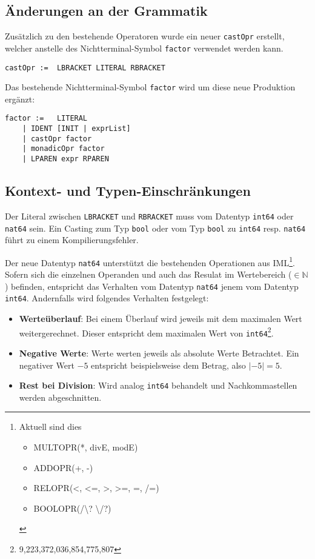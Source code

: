 \documentclass[10pt, a4paper, twocolumn]{article} %
\begin{document}
\subsection{Änderungen an der Grammatik}

Zusätzlich zu den bestehende Operatoren wurde ein neuer \texttt{castOpr} erstellt, welcher anstelle des Nichtterminal-Symbol \texttt{factor} verwendet werden kann.
\begin{lstlisting}[backgroundcolor = \color{lightgray},
xleftmargin = 0.05cm,
framexleftmargin = 0.05em]
    castOpr :=  LBRACKET LITERAL RBRACKET
\end{lstlisting}
Das bestehende Nichtterminal-Symbol \texttt{factor} wird um diese neue Produktion ergänzt:
\begin{lstlisting}[backgroundcolor = \color{lightgray},
xleftmargin = 0.05cm,
framexleftmargin = 0.05em]
    factor :=   LITERAL
    | IDENT [INIT | exprList]
    | castOpr factor
    | monadicOpr factor
    | LPAREN expr RPAREN
\end{lstlisting}

\subsection{Kontext- und Typen-Einschränkungen}
Der Literal zwischen \texttt{LBRACKET} und \texttt{RBRACKET} muss vom Datentyp \texttt{int64} oder \texttt{nat64} sein.
Ein Casting zum Typ \texttt{bool} oder vom Typ \texttt{bool} zu \texttt{int64} resp. \texttt{nat64} führt zu einem Kompilierungsfehler.

Der neue Datentyp \texttt{nat64} unterstützt die bestehenden Operationen aus IML\footnote{Aktuell sind dies \begin{itemize} \item MULTOPR(*, divE, modE) \item ADDOPR(+, -) \item RELOPR(<, <=, >, >=, =, /=) \item BOOLOPR(/\textbackslash? \textbackslash/?)\end{itemize}}.
Sofern sich die einzelnen Operanden und auch das Resulat im Wertebereich ($\in \mathbb{N}$) befinden, entspricht das Verhalten vom Datentyp \texttt{nat64} jenem vom Datentyp \texttt{int64}.
Andernfalls wird folgendes Verhalten festgelegt:

\begin{itemize}
    \item \textbf{Werteüberlauf}: Bei einem Überlauf wird jeweils mit dem maximalen Wert weitergerechnet. Dieser entspricht dem maximalen Wert von \texttt{int64}\footnote{9,223,372,036,854,775,807}.
    \item \textbf{Negative Werte}: Werte werten jeweils als absolute Werte Betrachtet. Ein negativer Wert $-5$ entspricht beispielsweise dem Betrag, also $|-5| = 5$.
    \item \textbf{Rest bei Division}: Wird analog \texttt{int64} behandelt und Nachkommastellen werden abgeschnitten.
\end{itemize}
\end{document}
